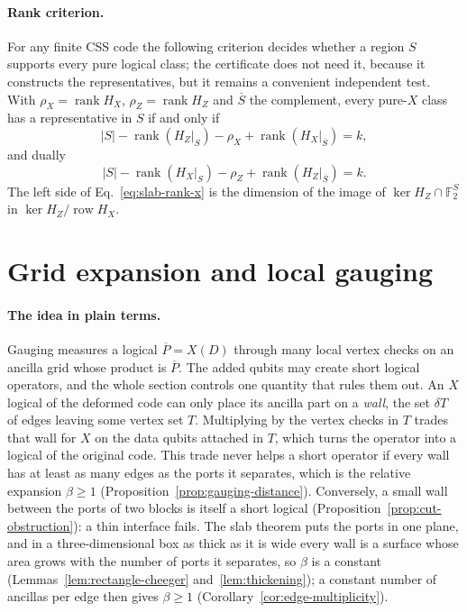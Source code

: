 \documentclass[aps,prx,reprint,superscriptaddress,nofootinbib,floatfix,longbibliography]{revtex4-2}
\theoremstyle{definition}
\DeclareMathOperator{\rank}{rank}
\begin{document}
\paragraph{Rank criterion.}
For any finite CSS code the following criterion decides whether a region
$S$ supports every pure logical class; the certificate does not need it,
because it constructs the representatives, but it remains a convenient
independent test.  With $\rho_X=\rank H_X$, $\rho_Z=\rank H_Z$ and $\overline S$ the
complement, every pure-$X$ class has a representative in $S$ if and only if
\begin{equation}
 |S|-\rank(H_Z|_S)-\rho_X+\rank(H_X|_{\overline S})=k,
 \label{eq:slab-rank-x}
\end{equation}
and dually
\begin{equation}
 |S|-\rank(H_X|_S)-\rho_Z+\rank(H_Z|_{\overline S})=k.
 \label{eq:slab-rank-z}
\end{equation}
The left side of Eq.~\eqref{eq:slab-rank-x} is the dimension of the image of
$\ker H_Z\cap\mathbb F_2^S$ in $\ker H_Z/\operatorname{row}H_X$.


\section{Grid expansion and local gauging}\label{sec:gauging}

\paragraph{The idea in plain terms.}
Gauging measures a logical $\overline P=X(D)$ through many local vertex
checks on an ancilla grid whose product is $\overline P$.  The added qubits
may create short logical operators, and the whole section controls one
quantity that rules them out.  An $X$ logical of the deformed code can only
place its ancilla part on a \emph{wall}, the set $\delta T$ of edges leaving
some vertex set $T$.  Multiplying by the vertex checks in $T$ trades that wall
for $X$ on the data qubits attached in $T$, which turns the operator into a
logical of the original code.  This trade never helps a short operator if
every wall has at least as many edges as the ports it separates, which is the
relative expansion $\beta\ge1$ (Proposition~\ref{prop:gauging-distance}).
Conversely, a small wall between the ports of two blocks is itself a short
logical (Proposition~\ref{prop:cut-obstruction}): a thin interface fails.
The slab theorem puts the ports in one plane, and in a three-dimensional box
as thick as it is wide every wall is a surface whose area grows with the
number of ports it separates, so $\beta$ is a constant
(Lemmas~\ref{lem:rectangle-cheeger} and~\ref{lem:thickening}); a constant
number of ancillas per edge then gives $\beta\ge1$
(Corollary~\ref{cor:edge-multiplicity}).
\end{document}
